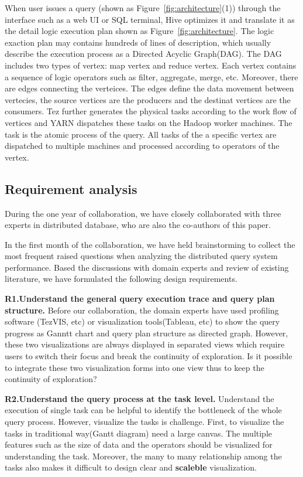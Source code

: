 When user issues a query (shown as Figure~\ref{fig:architecture}(1)) through the interface such as a web UI or SQL terminal, Hive optimizes it and translate it as the detail logic execution plan shown as Figure~\ref{fig:architecture}. The logic exaction plan may contains hundreds of lines of description, which usually describe the execution process as a Directed Acyclic Graph(DAG). The DAG includes two types of vertex: map vertex and reduce vertex. Each vertex contains a sequence of logic operators such as filter, aggregate, merge, etc. Moreover, there are edges connecting the verteices. The edges define the data movement between vertecies, the source vertices are the producers and the destinat vertices are the consumers.
Tez further generates the physical tasks according to the work flow of vertices and YARN dispatches these tasks on the Hadoop worker machines.  The task is the atomic process of the query. All tasks of the a specific vertex are dispatched to multiple machines and processed according to operators of the vertex.  

\subsection{Requirement analysis}
During the one year of collaboration, we have closely collaborated with three experts in distributed database, who are also the co-authors of this paper.

In the first month of the collaboration, we have held brainstorming to collect the most frequent raised questions when analyzing the distributed query system performance. Based the discussions with domain experts and review of existing literature, we have formulated the following design requirements.

\textbf{R1.Understand the general query execution trace and query plan structure.} Before our collaboration, the domain experts have used profiling software (TezVIS, etc) or visualization tools(Tableau, etc) to show the query progress as Ganntt chart and query plan structure as directed graph. However, these two visualizations are always displayed in separated views which require users to switch their focus and break the continuity of exploration. Is it possible to  integrate these two visualization forms into one view thus to keep the continuity of exploration?

\textbf{R2.Understand the query process at the task level.}
Understand the execution of single task can be helpful to identify the bottleneck of the whole query process.
However, visualize the tasks is challenge. First, to visualize the tasks in traditional way(Gantt diagram) need a large canvas. The multiple features such as the size of data and the operators should be visualized for understanding the task. Moreover, the many to many relationship among the tasks also makes it difficult to design clear and \textbf{scaleble} visualization.

